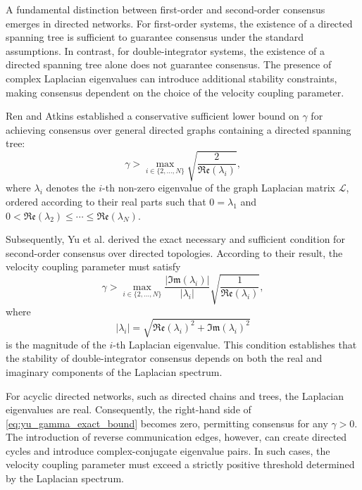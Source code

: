 A fundamental distinction between first-order and second-order consensus emerges in directed networks. For first-order systems, the existence of a directed spanning tree is sufficient to guarantee consensus under the standard assumptions. In contrast, for double-integrator systems, the existence of a directed spanning tree alone does not guarantee consensus. The presence of complex Laplacian eigenvalues can introduce additional stability constraints, making consensus dependent on the choice of the velocity coupling parameter.

Ren and Atkins \cite{ren2005second} established a conservative sufficient lower bound on $\gamma$ for achieving consensus over general directed graphs containing a directed spanning tree:
\begin{equation}
\label{eq:ren_gamma_bound}
    \gamma >
    \max_{i\in\{2,\ldots,N\}}
    \sqrt{\frac{2}{\mathfrak{Re}(\lambda_i)}},
\end{equation}
where $\lambda_i$ denotes the $i$-th non-zero eigenvalue of the graph Laplacian matrix $\mathcal{L}$, ordered according to their real parts such that
$0=\lambda_1$ and
$0<\mathfrak{Re}(\lambda_2)\leq\cdots\leq\mathfrak{Re}(\lambda_N)$.

Subsequently, Yu et al. \cite{yu2009second, yu2010some} derived the exact necessary and sufficient condition for second-order consensus over directed topologies. According to their result, the velocity coupling parameter must satisfy
\begin{equation}
\label{eq:yu_gamma_exact_bound}
    \gamma >
    \max_{i\in\{2,\ldots,N\}}
    \frac{|\mathfrak{Im}(\lambda_i)|}{|\lambda_i|}
    \sqrt{\frac{1}{\mathfrak{Re}(\lambda_i)}},
\end{equation}
where
\[
    |\lambda_i|=
    \sqrt{
    \mathfrak{Re}(\lambda_i)^2+
    \mathfrak{Im}(\lambda_i)^2
    }
\]
is the magnitude of the $i$-th Laplacian eigenvalue. This condition establishes that the stability of double-integrator consensus depends on both the real and imaginary components of the Laplacian spectrum.

For acyclic directed networks, such as directed chains and trees, the Laplacian eigenvalues are real. Consequently, the right-hand side of \eqref{eq:yu_gamma_exact_bound} becomes zero, permitting consensus for any $\gamma>0$. The introduction of reverse communication edges, however, can create directed cycles and introduce complex-conjugate eigenvalue pairs. In such cases, the velocity coupling parameter must exceed a strictly positive threshold determined by the Laplacian spectrum.

